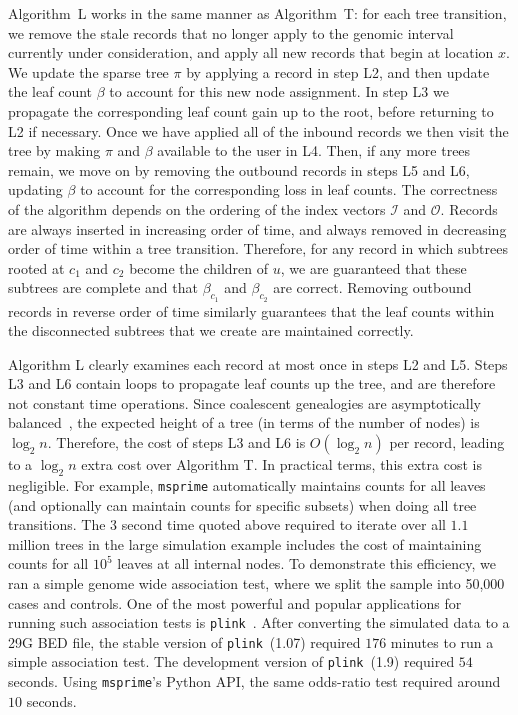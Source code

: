 \documentclass[10pt,letterpaper]{article}
\newcommand{\indexin}[0]{\ensuremath{\mathcal{I}}}
\newcommand{\indexout}[0]{\ensuremath{\mathcal{O}}}
\newcommand{\msprime}[0]{\texttt{msprime}}
\newcommand{\plink}[0]{\texttt{plink}}
\begin{document}
Algorithm~L works in the same manner as Algorithm~T: for each tree transition,
we remove the stale records that no longer apply to the genomic interval
currently under consideration, and apply all new records that begin at location
$x$. We update the sparse tree $\pi$ by applying a record in step L2, and then
update the leaf count $\beta$ to account for this new node assignment. In step
L3 we propagate the corresponding leaf count gain up to the root, before
returning to L2 if necessary. Once we have applied all of the inbound records
we then visit the tree by making $\pi$ and $\beta$ available to the user in L4.
Then, if any more trees remain, we move on by removing the outbound records in
steps L5 and L6, updating $\beta$ to account for the corresponding loss in leaf
counts. The correctness of the algorithm depends on the ordering of the index
vectors $\indexin$ and $\indexout$. Records are always inserted in increasing
order of time, and always removed in decreasing order of time within a tree
transition. Therefore, for any record in which subtrees rooted at $c_1$ and
$c_2$ become the children of $u$, we are guaranteed that these subtrees are
complete and that $\beta_{c_1}$ and $\beta_{c_2}$ are correct. Removing
outbound records in reverse order of time similarly guarantees that the leaf
counts within the disconnected subtrees that we create are maintained
correctly.

Algorithm L clearly examines each record at most once in steps L2 and L5. Steps
L3 and L6 contain loops to propagate leaf counts up the tree, and are therefore
not constant time operations. Since coalescent genealogies are asymptotically
balanced~\citep{lw13}, the expected height of a tree (in terms of the number of
nodes) is $\log_2 n$. Therefore, the cost of steps L3 and L6 is $O(\log_2 n)$
per record, leading to a $\log_2 n$ extra cost over Algorithm T. In practical
terms, this extra cost is negligible. For example, \texttt{msprime}
automatically maintains counts for all leaves (and optionally can maintain
counts for specific subsets) when doing all tree transitions. The $3$ second
time quoted above required to iterate over all $1.1$ million trees in the large
simulation example includes the cost of maintaining counts for all $10^5$
leaves at all internal nodes. To demonstrate this efficiency, we ran a simple
genome wide association test, where we split the sample into 50,000 cases and
controls. One of the most powerful and popular applications for running such
association tests is \plink~\citep{pnbt07}. After converting the simulated data
to a 29G BED file, the stable version of \plink\ (1.07) required $176$ minutes
to run a simple association test. The development version of \plink\ (1.9)
required $54$ seconds. Using \msprime's Python API, the same odds-ratio test
required around $10$ seconds.
\end{document}
